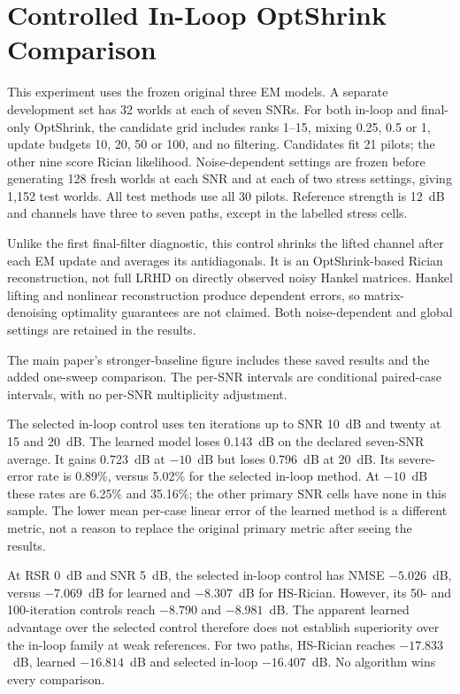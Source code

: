 \section{Controlled In-Loop OptShrink Comparison}
This experiment uses the frozen original three EM models. A separate
development set has 32 worlds at each of seven SNRs. For both in-loop and
final-only OptShrink, the candidate grid includes ranks 1--15, mixing
0.25, 0.5 or 1, update budgets 10, 20, 50 or 100, and no filtering.
Candidates fit 21 pilots; the other nine score Rician likelihood.
Noise-dependent settings are frozen before generating 128 fresh worlds
at each SNR and at each of two stress settings, giving 1,152 test worlds.
All test methods use all 30 pilots. Reference strength is 12~dB and
channels have three to seven paths, except in the labelled stress cells.

Unlike the first final-filter diagnostic, this control shrinks the lifted
channel after each EM update and averages its antidiagonals. It is an
OptShrink-based Rician reconstruction, not full LRHD on directly observed
noisy Hankel matrices. Hankel lifting and nonlinear reconstruction produce
dependent errors, so matrix-denoising optimality guarantees are not claimed.
Both noise-dependent and global settings are retained in the results.

The main paper's stronger-baseline figure includes these saved results
and the added one-sweep comparison. The per-SNR intervals are conditional
paired-case intervals, with no per-SNR multiplicity adjustment.

The selected in-loop control uses ten iterations up to SNR 10~dB and
twenty at 15 and 20~dB. The learned model loses 0.143~dB on the declared
seven-SNR average. It gains 0.723~dB at $-10$~dB but loses 0.796~dB at
20~dB. Its severe-error rate is 0.89\%, versus 5.02\% for the selected
in-loop method. At $-10$~dB these rates are 6.25\% and 35.16\%; the
other primary SNR cells have none in this sample. The lower mean per-case
linear error of the learned method is a different metric, not a reason
to replace the original primary metric after seeing the results.

At RSR 0~dB and SNR 5~dB, the selected in-loop control has NMSE
$-5.026$~dB, versus $-7.069$~dB for learned and $-8.307$~dB for HS-Rician.
However, its 50- and 100-iteration controls reach $-8.790$ and $-8.981$~dB.
The apparent learned advantage over the selected control therefore does
not establish superiority over the in-loop family at weak references.
For two paths, HS-Rician reaches $-17.833$~dB, learned $-16.814$~dB and
selected in-loop $-16.407$~dB. No algorithm wins every comparison.

